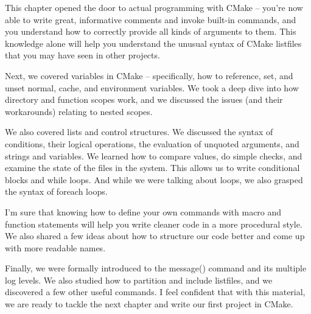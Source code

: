 This chapter opened the door to actual programming with CMake – you're now able to write great, informative comments and invoke built-in commands, and you understand how to correctly provide all kinds of arguments to them. This knowledge alone will help you understand the unusual syntax of CMake listfiles that you may have seen in other projects.

Next, we covered variables in CMake – specifically, how to reference, set, and unset normal, cache, and environment variables. We took a deep dive into how directory and function scopes work, and we discussed the issues (and their workarounds) relating to nested scopes.

We also covered lists and control structures. We discussed the syntax of conditions, their logical operations, the evaluation of unquoted arguments, and strings and variables. We learned how to compare values, do simple checks, and examine the state of the files in the system. This allows us to write conditional blocks and while loops. And while we were talking about loops, we also grasped the syntax of foreach loops.

I'm sure that knowing how to define your own commands with macro and function statements will help you write cleaner code in a more procedural style. We also shared a few ideas about how to structure our code better and come up with more readable names.

Finally, we were formally introduced to the message() command and its multiple log levels. We also studied how to partition and include listfiles, and we discovered a few other useful commands. I feel confident that with this material, we are ready to tackle the next chapter and write our first project in CMake.